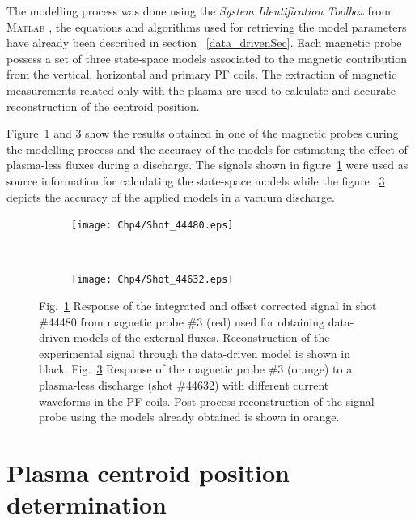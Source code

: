  The modelling process was done using the \textit{System Identification Toolbox} from \textsc{Matlab} \cite[Chapters~2,3]{Toolbox}, the equations and algorithms used for retrieving the model parameters have already been described  in section ~\ref{data_drivenSec}. Each magnetic probe possess a set of three state-space models associated to the magnetic contribution from the vertical, horizontal and primary PF coils. The extraction of magnetic measurements related only with the plasma  are used to calculate and accurate reconstruction of the centroid position. \smallskip


Figure~\ref{fig:44480} and \ref{fig:44632} show the results obtained in one of the magnetic probes during the modelling process and the accuracy of the models for estimating the effect of plasma-less fluxes during a discharge. The signals shown in figure~\ref{fig:44480} were used as source information for calculating the state-space models while the figure ~\ref{fig:44632} depicts the accuracy of the applied models in a vacuum discharge.

\begin{figure}
	\begin{subfigure}[b]{0.47\textwidth}
		\texttt{[image: Chp4/Shot\_44480.eps]}  
		\caption{\label{fig:44480} }
	\end{subfigure}
~
	\begin{subfigure}[b]{0.47\textwidth}
		\texttt{[image: Chp4/Shot\_44632.eps]}        
		\caption{\label{fig:44632}}
	\end{subfigure}
	
	\caption{Fig.~\ref{fig:44480} Response of the integrated and offset corrected signal in shot \#44480 from magnetic probe \#3 (red) used for obtaining data-driven models of the external fluxes. Reconstruction of the experimental signal through the data-driven model is shown in black. Fig.~\ref{fig:44632} Response of the  magnetic probe \#3 (orange) to a plasma-less discharge (shot \#44632) with different current waveforms in the PF coils. Post-process reconstruction of the  signal probe using the  models already obtained   is shown in orange. }
\end{figure}


\section{Plasma centroid position determination}

